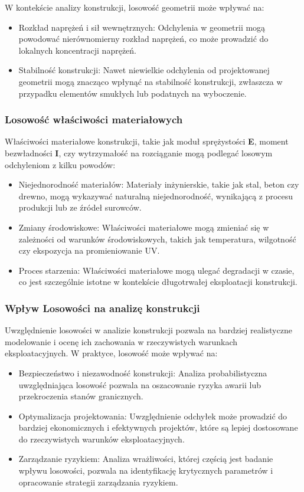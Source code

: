 W kontekście analizy konstrukcji, losowość geometrii może wpływać na:

\begin{itemize}
\item Rozkład naprężeń i sił wewnętrznych: Odchylenia w geometrii mogą powodować nierównomierny rozkład naprężeń, co może prowadzić do lokalnych koncentracji naprężeń.
\item Stabilność konstrukcji: Nawet niewielkie odchylenia od projektowanej geometrii mogą znacząco wpłynąć na stabilność konstrukcji, zwłaszcza w przypadku elementów smukłych lub podatnych na wyboczenie.
\end{itemize}

\subsubsection*{Losowość właściwości materiałowych}

Właściwości materiałowe konstrukcji, takie jak moduł sprężystości \textbf{E}, moment bezwładności \textbf{I}, czy wytrzymałość na rozciąganie \sigma mogą podlegać losowym odchyleniom z kilku powodów:

\begin{itemize}
    \item Niejednorodność materiałów: Materiały inżynierskie, takie jak stal, beton czy drewno, mogą wykazywać naturalną niejednorodność, wynikającą z procesu produkcji lub ze źródeł surowców.
    \item Zmiany środowiskowe: Właściwości materiałowe mogą zmieniać się w zależności od warunków środowiskowych, takich jak temperatura, wilgotność czy ekspozycja na promieniowanie UV.
    \item Proces starzenia: Właściwości materiałowe mogą ulegać degradacji w czasie, co jest szczególnie istotne w kontekście długotrwałej eksploatacji konstrukcji.
\end{itemize}

\subsubsection*{Wpływ Losowości na analizę konstrukcji}

Uwzględnienie losowości w analizie konstrukcji pozwala na bardziej realistyczne modelowanie i ocenę ich zachowania w rzeczywistych warunkach eksploatacyjnych.
W praktyce, losowość może wpływać na:

\begin{itemize}
    \item Bezpieczeństwo i niezawodność konstrukcji: Analiza probabilistyczna uwzględniająca losowość pozwala na oszacowanie ryzyka awarii lub przekroczenia stanów granicznych.
    \item Optymalizacja projektowania: Uwzględnienie odchyłek może prowadzić do bardziej ekonomicznych i efektywnych projektów, które są lepiej dostosowane do rzeczywistych warunków eksploatacyjnych.
    \item Zarządzanie ryzykiem: Analiza wrażliwości, której częścią jest badanie wpływu losowości, pozwala na identyfikację krytycznych parametrów i opracowanie strategii zarządzania ryzykiem.
\end{itemize}

